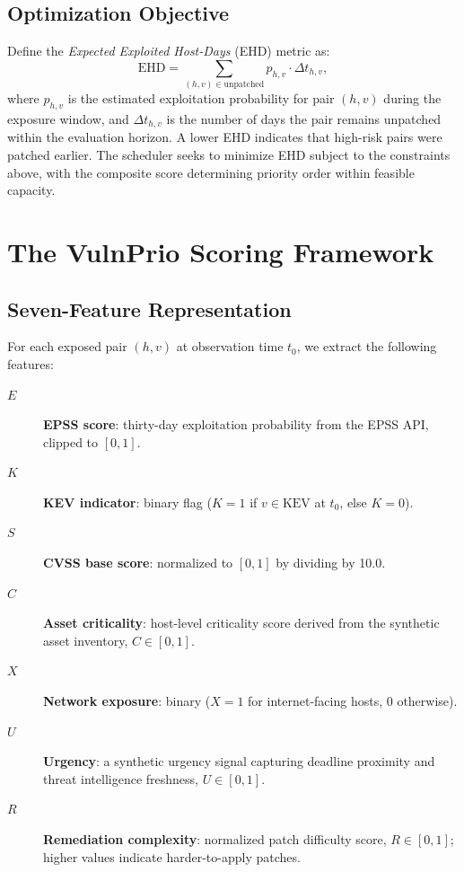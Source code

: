 \documentclass[journal]{IEEEtran}
\begin{document}
\subsection{Optimization Objective}

Define the \emph{Expected Exploited Host-Days} (EHD) metric as:
\begin{equation}
  \text{EHD} = \sum_{(h,v) \in \text{unpatched}} p_{h,v}
                \cdot \Delta t_{h,v},
\label{eq:ehd}
\end{equation}
where $p_{h,v}$ is the estimated exploitation probability for
pair $(h,v)$ during the exposure window, and $\Delta t_{h,v}$
is the number of days the pair remains unpatched within the
evaluation horizon.  A lower EHD indicates that high-risk
pairs were patched earlier.  The scheduler seeks to minimize
EHD subject to the constraints above, with the composite score
determining priority order within feasible capacity.

\section{The VulnPrio Scoring Framework}
\label{sec:framework}

\subsection{Seven-Feature Representation}

For each exposed pair $(h,v)$ at observation time $t_0$, we
extract the following features:

\begin{description}
  \item[$E$] \textbf{EPSS score}: thirty-day exploitation
    probability from the EPSS API, clipped to $[0,1]$.

  \item[$K$] \textbf{KEV indicator}: binary flag ($K=1$ if
    $v \in \text{KEV}$ at $t_0$, else $K=0$).

  \item[$S$] \textbf{CVSS base score}: normalized to $[0,1]$
    by dividing by 10.0.

  \item[$C$] \textbf{Asset criticality}: host-level criticality
    score derived from the synthetic asset inventory, $C \in [0,1]$.

  \item[$X$] \textbf{Network exposure}: binary ($X=1$ for
    internet-facing hosts, $0$ otherwise).

  \item[$U$] \textbf{Urgency}: a synthetic urgency signal
    capturing deadline proximity and threat intelligence freshness,
    $U \in [0,1]$.

  \item[$R$] \textbf{Remediation complexity}: normalized patch
    difficulty score, $R \in [0,1]$; higher values indicate
    harder-to-apply patches.
\end{description}
\end{document}
